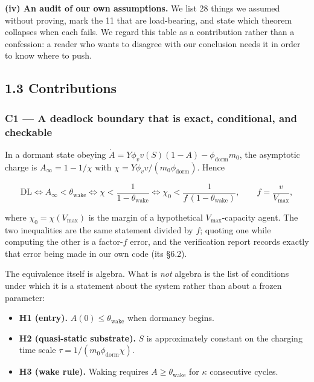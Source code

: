 \documentclass[11pt,a4paper]{article}
\providecommand{\tightlist}{\setlength{\itemsep}{0pt}\setlength{\parskip}{0pt}}
\begin{document}
\textbf{(iv) An audit of our own assumptions.} We list 28 things we assumed without
proving, mark the 11 that are load-bearing, and state which theorem collapses
when each fails. We regard this table as a contribution rather than a
confession: a reader who wants to disagree with our conclusion needs it in order
to know where to push.

\subsection{1.3 Contributions}\label{contributions}

\subsubsection{C1 --- A deadlock boundary that is exact, conditional, and checkable}\label{c1-a-deadlock-boundary-that-is-exact-conditional-and-checkable}

In a dormant state obeying \(\dot A=Y\phi_v v(S)(1-A)-\phi_{\mathrm{dorm}}m_0\),
the asymptotic charge is \(A_\infty=1-1/\chi\) with
\(\chi=Y\phi_v v/(m_0\phi_{\mathrm{dorm}})\). Hence

\[
\mathrm{DL}
\iff A_\infty<\theta_{\mathrm{wake}}
\iff \chi<\frac{1}{1-\theta_{\mathrm{wake}}}
\iff \chi_0<\frac{1}{f\,(1-\theta_{\mathrm{wake}})},
\qquad f=\frac{v}{V_{\max}},
\]

where \(\chi_0=\chi(V_{\max})\) is the margin of a hypothetical
\(V_{\max}\)-capacity agent. The two inequalities are the same statement divided by
\(f\); quoting one while computing the other is a factor-\(f\) error, and the
verification report records exactly that error being made in our own code
(its §6.2).

The equivalence itself is algebra. What is \emph{not} algebra is the list of
conditions under which it is a statement about the system rather than about a
frozen parameter:

\begin{itemize}
\tightlist
\item
  \textbf{H1 (entry).} \(A(0)\le\theta_{\mathrm{wake}}\) when dormancy begins.
\item
  \textbf{H2 (quasi-static substrate).} \(S\) is approximately constant on the charging
  time scale \(\tau=1/(m_0\phi_{\mathrm{dorm}}\chi)\).
\item
  \textbf{H3 (wake rule).} Waking requires \(A\ge\theta_{\mathrm{wake}}\) for \(\kappa\)
  consecutive cycles.
\end{itemize}
\end{document}
